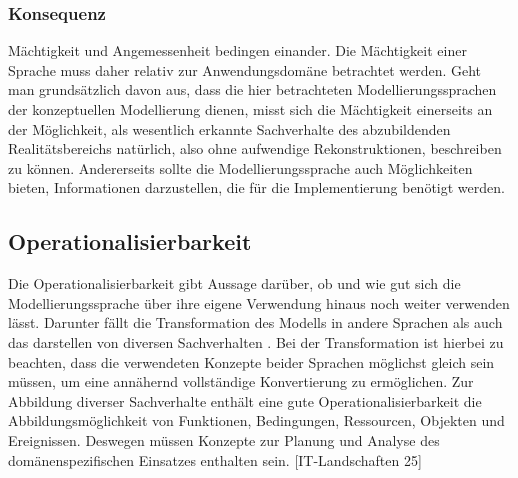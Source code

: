 \subsubsection{Konsequenz}
Mächtigkeit und Angemessenheit bedingen einander. Die Mächtigkeit einer Sprache muss daher relativ
zur Anwendungsdomäne betrachtet werden. Geht man grundsätzlich davon aus, dass die hier betrachteten
Modellierungssprachen der konzeptuellen Modellierung dienen, misst sich die Mächtigkeit einerseits
an der Möglichkeit, als wesentlich erkannte Sachverhalte des abzubildenden Realitätsbereichs
natürlich, also ohne aufwendige Rekonstruktionen, beschreiben zu können. Andererseits sollte die
Modellierungssprache auch Möglichkeiten bieten, Informationen darzustellen, die für die Implementierung
benötigt werden.


\subsection{Operationalisierbarkeit}
\label{ssc:Operationalisierbarkeit}
Die Operationalisierbarkeit gibt Aussage darüber, ob und wie gut sich die Modellierungssprache über ihre eigene Verwendung hinaus noch weiter verwenden lässt.
Darunter fällt die Transformation des Modells in andere Sprachen als auch das darstellen von diversen Sachverhalten \cite[95\psq]{JaneFröming_2009}.
Bei der Transformation ist hierbei zu beachten, dass die verwendeten Konzepte beider Sprachen möglichst gleich sein müssen,
um eine annähernd vollständige Konvertierung zu ermöglichen. Zur Abbildung diverser Sachverhalte enthält eine gute Operationalisierbarkeit die Abbildungsmöglichkeit von Funktionen, Bedingungen, Ressourcen, Objekten und Ereignissen.
Deswegen müssen Konzepte zur Planung und Analyse des domänenspezifischen Einsatzes enthalten sein.
[IT-Landschaften 25]

